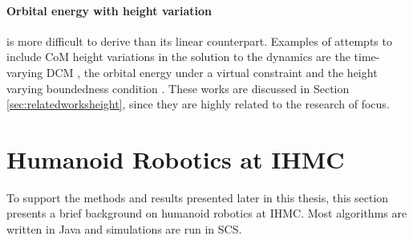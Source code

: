 \paragraph{Orbital energy with height variation}\label{subsec:nonorbit} is more difficult to derive than its linear counterpart.  Examples of attempts to include \ac{CoM} height variations in the solution to the dynamics are the time-varying \ac{DCM} \cite{hopkins2014humanoid}, the orbital energy under a virtual constraint \cite{pratt2007derivation} and the height varying boundedness condition \cite{caron2018balance}. These works are discussed in Section 
\ref{sec:relatedworksheight}, since they are highly related to the research of focus.

\section{Humanoid Robotics at IHMC}\label{sec:ihmc}
To support the methods and results presented later in this thesis, this section presents a brief background on humanoid robotics at \ac{IHMC}. Most algorithms are written in Java and simulations are run in \ac{SCS}.
